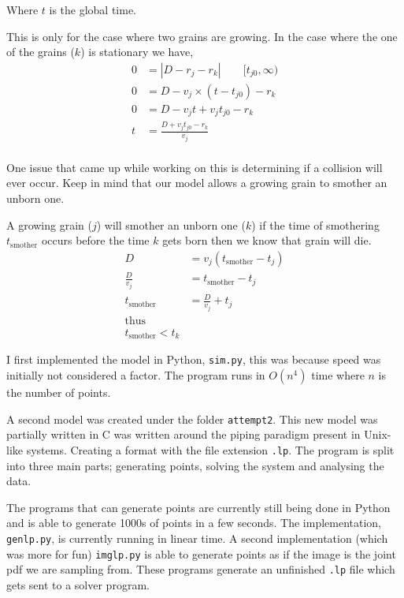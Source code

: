 \documentclass{article}
\begin{document}
Where $t$ is the global time.

This is only for the case where two grains are growing. In the case where the
one of the grains ($k$) is stationary we have,
\begin{align*}
    0 &= |D - r_j - r_k| \qquad [t_{j0}, \infty) \\
    0 &= D - v_j \times (t - t_{j0}) - r_k \\
    0 &= D - v_j t + v_j t_{j0} - r_k \\
    t &= \frac{D + v_j t_{j0} - r_k}{v_j} \\
\end{align*}

One issue that came up while working on this is determining if a collision will
ever occur. Keep in mind that our model allows a growing grain to smother an
unborn one.

A growing grain ($j$) will smother an unborn one ($k$) if the time of
smothering $t_{\text{smother}}$ occurs before the time $k$ gets born
then we know that grain will die.
\begin{align*}
    D &= v_j (t_{\text{smother}} - t_j) \\
    \frac{D}{v_j} &= t_{\text{smother}} - t_j \\
    t_{\text{smother}} &= \frac{D}{v_j} + t_j \\
    \text{thus} \\
    t_{\text{smother}} < t_k
\end{align*}

I first implemented the model in Python, \texttt{sim.py},
this was because speed was initially
not considered a factor. The program runs in $O(n^4)$ time where
$n$ is the number of points.

A second model was created under the folder \texttt{attempt2}. This new model
was partially written in C was written around the piping paradigm
present in Unix-like systems. Creating a format with the file extension
\texttt{.lp}. The program is split into three main parts; generating points,
solving the system and analysing the data.

The programs that
can generate points are currently still being done in Python and
is able to generate 1000s of points in a few seconds. The implementation,
\texttt{genlp.py}, is currently running in linear time. A second implementation
(which was more for fun) \texttt{imglp.py} is able to generate points as if the
image is the joint pdf we are sampling from. These programs generate an
unfinished \texttt{.lp} file which gets sent to a solver program.
\end{document}
